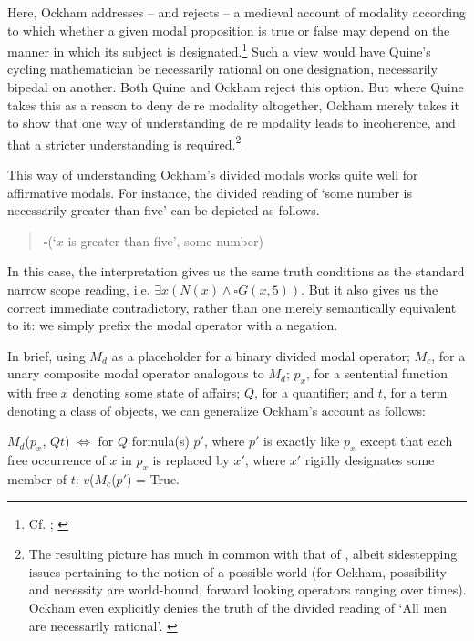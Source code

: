 \documentclass[a4paper]{article}
\begin{document}
\noindent Here, Ockham addresses – and rejects – a medieval account of modality according to which whether a given modal proposition is true or false may depend on the manner in which its subject is designated.\footnote{Cf. \cite[ch. 3, 12]{Anselm1974}; \cite[ch. 12]{AquinasDF}} Such a view would have Quine's cycling mathematician be necessarily rational on one designation, necessarily bipedal on another. Both Quine and Ockham reject this option. But where Quine takes this as a reason to deny de re modality altogether, Ockham merely takes it to show that one way of understanding de re modality leads to incoherence, and that a stricter understanding is required.\footnote{The resulting picture has much in common with that of \cite{Kripke1980}, albeit sidestepping issues pertaining to the notion of a possible world (for Ockham, possibility and necessity are world-bound, forward looking operators ranging over times). Ockham even explicitly denies the truth of the divided reading of `All men are necessarily rational'. \cite[II. 9, p. 246]{OckhamSL2}}

This way of understanding Ockham's divided modals works quite well for affirmative modals. For instance, the divided reading of `some number is necessarily greater than five' can be depicted as follows. 

\begin{quote}
$\square$(`$x$ is greater than five', some number)

\end{quote}

In this case, the interpretation gives us the same truth conditions as the standard narrow scope reading, i.e. $\exists x(N(x) \wedge \square G(x, 5))$. But it also gives us the correct immediate contradictory, rather than one merely semantically equivalent to it: we simply prefix the modal operator with a negation.

In brief, using $M_{d}$ as a placeholder for a binary divided modal operator; $M_{c}$, for a unary composite modal operator analogous to $M_{d}$; $p_{x}$, for a sentential function with free $x$ denoting some state of affairs; $Q$, for a quantifier; and $t$, for a term denoting a class of objects, we can generalize Ockham's account as follows:

$M_{d}$($p_{x}$, $Qt$) $\Leftrightarrow$ for $Q$ formula(s) $p'$, where  $p'$ is exactly like $p_{x}$ except that each free occurrence of $x$ in $p_{x}$ is replaced by $x'$, where $x'$ rigidly designates some member of $t$: $v$($M_{c}$($p'$) = True.
\end{document}
